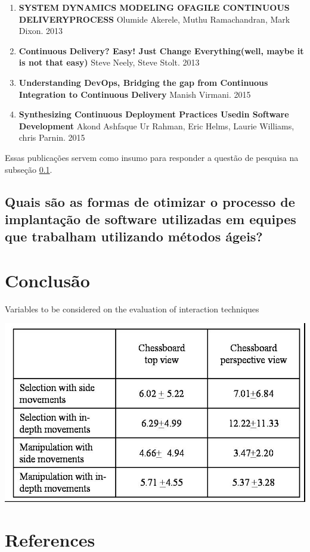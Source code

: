 \documentclass[12pt]{article}
\begin{document}
\begin{enumerate}
\begin{enumerate}
      \item \textbf{SYSTEM DYNAMICS MODELING OFAGILE CONTINUOUS DELIVERYPROCESS} Olumide Akerele, Muthu Ramachandran, Mark Dixon. 2013
      \item \textbf{Continuous Delivery? Easy! Just Change Everything(well, maybe it is not that easy)} Steve Neely, Steve Stolt.  2013
      \item \textbf{Understanding DevOps, Bridging the gap from Continuous Integration to Continuous Delivery} Manish Virmani.  2015
      \item \textbf{Synthesizing Continuous Deployment Practices Usedin Software Development} Akond Ashfaque Ur Rahman, Eric Helms, Laurie Williams, chris Parnin. 2015
  \end{enumerate}
\end{enumerate}

Essas publicações servem como insumo para responder a questão de pesquisa na subseção \ref{sec5:subsec1}.

\subsection{Quais são as formas de otimizar o processo de implantação de software utilizadas em equipes que trabalham utilizando métodos ágeis?} \label{sec5:subsec1}



\section{Conclusão} \label{sec6}

\begin{table}[ht]
\centering
\caption{Variables to be considered on the evaluation of interaction
  techniques}
\label{tab:exTable1}
\includegraphics[width=.7\textwidth]{table.jpg}
\end{table}


\section{References}


\end{document}
